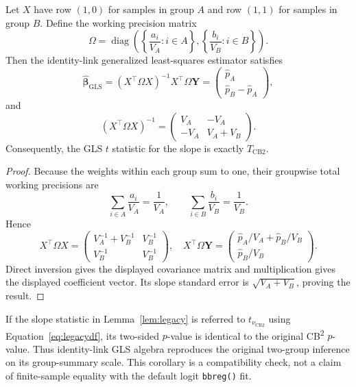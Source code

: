 \begin{lemma}
\label{lem:legacy}
Let $X$ have row $(1,0)$ for samples in group $A$ and row $(1,1)$
for samples in group $B$.  Define the working precision matrix
\[
 \Omega=\operatorname{diag}\left(
 \left\{\frac{a_i}{V_A}:i\in A\right\},
 \left\{\frac{b_i}{V_B}:i\in B\right\}\right).
\]
Then the identity-link generalized least-squares estimator satisfies
\[
 \widehat{\boldsymbol\beta}_{\mathrm{GLS}}
 =(X^\top\Omega X)^{-1}X^\top\Omega\mathbf{Y}
 =
 \begin{pmatrix}\widehat p_A\\ \widehat p_B-\widehat p_A\end{pmatrix},
\]
and
\[
 (X^\top\Omega X)^{-1}
 =
 \begin{pmatrix}
 V_A & -V_A\\
 -V_A & V_A+V_B
 \end{pmatrix}.
\]
Consequently, the GLS $t$ statistic for the slope is exactly
$T_{\mathrm{CB2}}$.
\end{lemma}

\begin{proof}
Because the weights within each group sum to one, their groupwise total
working precisions are
\[
 \sum_{i\in A}\frac{a_i}{V_A}=\frac{1}{V_A},
 \qquad
 \sum_{i\in B}\frac{b_i}{V_B}=\frac{1}{V_B}.
\]
Hence
\[
 X^\top\Omega X=
 \begin{pmatrix}
 V_A^{-1}+V_B^{-1} & V_B^{-1}\\
 V_B^{-1} & V_B^{-1}
 \end{pmatrix},
\quad
 X^\top\Omega\mathbf{Y}=
 \begin{pmatrix}
 \widehat p_A/V_A+\widehat p_B/V_B\\
 \widehat p_B/V_B
 \end{pmatrix}.
\]
Direct inversion gives the displayed covariance matrix and multiplication
gives the displayed coefficient vector.  Its slope standard error is
$\sqrt{V_A+V_B}$, proving the result.
\end{proof}

\begin{corollary}
If the slope statistic in Lemma~\ref{lem:legacy} is referred to
$t_{\nu_{\mathrm{CB2}}}$ using Equation~\eqref{eq:legacydf}, its two-sided
$p$-value is identical to the original CB\textsuperscript{2} $p$-value.
Thus identity-link GLS algebra reproduces the original two-group inference on
its group-summary scale.  This corollary is a compatibility check, not a claim
of finite-sample equality with the default logit \texttt{bbreg()} fit.
\end{corollary}

